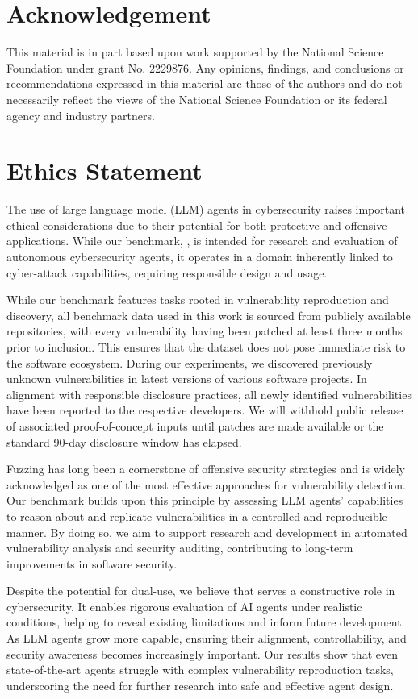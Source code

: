 \section*{Acknowledgement}
This material is in part based upon work supported by the National Science Foundation under grant No. 2229876.
Any opinions, findings, and conclusions or recommendations expressed in this material are those of the authors and do not necessarily reflect the views of the National Science Foundation or its federal agency and industry partners.

\section*{Ethics Statement}
\label{sec:ethics}
The use of large language model (LLM) agents in cybersecurity raises important ethical considerations due to their potential for both protective and offensive applications. While our benchmark, \sysname, is intended for research and evaluation of autonomous cybersecurity agents, it operates in a domain inherently linked to cyber-attack capabilities, requiring responsible design and usage.

While our benchmark features tasks rooted in vulnerability reproduction and discovery, all benchmark data used in this work is sourced from publicly available repositories, with every vulnerability having been patched at least three months prior to inclusion.
This ensures that the dataset does not pose immediate risk to the software ecosystem.
During our experiments, we discovered previously unknown vulnerabilities in latest versions of various software projects. In alignment with responsible disclosure practices, all newly identified vulnerabilities have been reported to the respective developers. We will withhold public release of associated proof-of-concept inputs until patches are made available or the standard 90-day disclosure window has elapsed.

Fuzzing has long been a cornerstone of offensive security strategies and is widely acknowledged as one of the most effective approaches for vulnerability detection. Our benchmark builds upon this principle by assessing LLM agents' capabilities to reason about and replicate vulnerabilities in a controlled and reproducible manner. By doing so, we aim to support research and development in automated vulnerability analysis and security auditing, contributing to long-term improvements in software security.

Despite the potential for dual-use, we believe that \sysname serves a constructive role in cybersecurity. It enables rigorous evaluation of AI agents under realistic conditions, helping to reveal existing limitations and inform future development. As LLM agents grow more capable, ensuring their alignment, controllability, and security awareness becomes increasingly important. Our results show that even state-of-the-art agents struggle with complex vulnerability reproduction tasks, underscoring the need for further research into safe and effective agent design.

